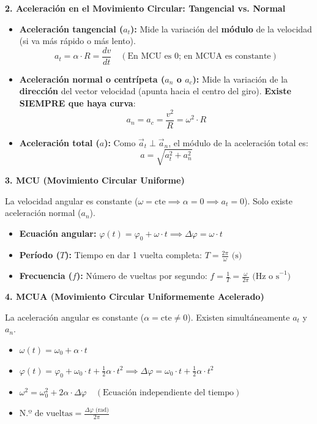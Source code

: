 ﻿\documentclass[11pt,a4paper]{article}
\begin{document}
\vspace{0.2cm}
\noindent\textbf{2. Aceleración en el Movimiento Circular: Tangencial vs. Normal}

\begin{itemize}[leftmargin=1.5em, itemsep=4pt]
    \item \textbf{Aceleración tangencial ($a_t$):} Mide la variación del \textbf{módulo} de la velocidad (si va más rápido o más lento).
    \[
    a_t = \alpha \cdot R = \frac{dv}{dt} \quad (\text{En MCU es } 0\text{; en MCUA es constante})
    \]
    \item \textbf{Aceleración normal o centrípeta ($a_n$ o $a_c$):} Mide la variación de la \textbf{dirección} del vector velocidad (apunta hacia el centro del giro). \textbf{Existe SIEMPRE que haya curva}:
    \[
    a_n = a_c = \frac{v^2}{R} = \omega^2 \cdot R
    \]
    \item \textbf{Aceleración total ($a$):} Como $\vec{a}_t \perp \vec{a}_n$, el módulo de la aceleración total es:
    \[
    a = \sqrt{a_t^2 + a_n^2}
    \]
\end{itemize}

\vspace{0.2cm}
\noindent\textbf{3. MCU (Movimiento Circular Uniforme)}

\noindent La velocidad angular es constante ($\omega = \text{cte} \implies \alpha = 0 \implies a_t = 0$). Solo existe aceleración normal ($a_n$).
\begin{itemize}[leftmargin=1.5em, itemsep=3pt]
    \item \textbf{Ecuación angular:} $\varphi(t) = \varphi_0 + \omega \cdot t \implies \Delta\varphi = \omega \cdot t$
    \item \textbf{Período ($T$):} Tiempo en dar 1 vuelta completa: $T = \frac{2\pi}{\omega}\text{ (s)}$
    \item \textbf{Frecuencia ($f$):} Número de vueltas por segundo: $f = \frac{1}{T} = \frac{\omega}{2\pi}\text{ (Hz o s}^{-1}\text{)}$
\end{itemize}

\vspace{0.2cm}
\noindent\textbf{4. MCUA (Movimiento Circular Uniformemente Acelerado)}

\noindent La aceleración angular es constante ($\alpha = \text{cte} \neq 0$). Existen simultáneamente $a_t$ y $a_n$.
\begin{itemize}[leftmargin=1.5em, itemsep=3pt]
    \item $\omega(t) = \omega_0 + \alpha \cdot t$
    \item $\varphi(t) = \varphi_0 + \omega_0 \cdot t + \frac{1}{2}\alpha \cdot t^2 \implies \Delta\varphi = \omega_0 \cdot t + \frac{1}{2}\alpha \cdot t^2$
    \item $\omega^2 = \omega_0^2 + 2\alpha \cdot \Delta\varphi \quad (\text{Ecuación independiente del tiempo})$
    \item $\text{N.º de vueltas} = \frac{\Delta\varphi\text{ (rad)}}{2\pi}$
\end{itemize}
\end{document}
